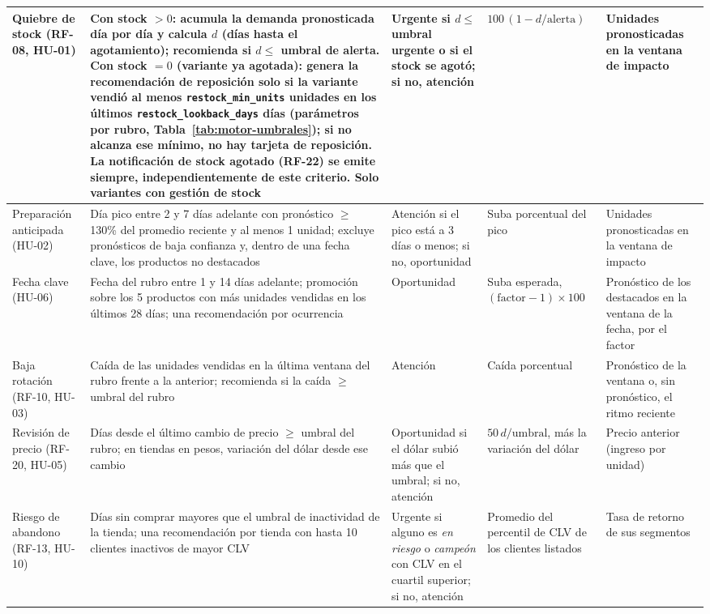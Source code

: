 {\begin{longtable}{|>{\raggedright\arraybackslash}m{2.2cm}|>{\raggedright\arraybackslash}m{4.1cm}|>{\raggedright\arraybackslash}m{2.6cm}|>{\raggedright\arraybackslash}m{1.9cm}|>{\raggedright\arraybackslash}m{2.4cm}|}
Quiebre de stock (RF-08, HU-01) & Con stock $>0$: acumula la demanda pronosticada día por día y calcula $d$ (días hasta el agotamiento); recomienda si $d \le$ umbral de alerta. Con stock $= 0$ (variante ya agotada): genera la recomendación de reposición solo si la variante vendió al menos \texttt{restock\_min\_units} unidades en los últimos \texttt{restock\_lookback\_days} días (parámetros por rubro, Tabla~\ref{tab:motor-umbrales}); si no alcanza ese mínimo, no hay tarjeta de reposición. La notificación de stock agotado (RF-22) se emite siempre, independientemente de este criterio. Solo variantes con gestión de stock & Urgente si $d \le$ umbral urgente o si el stock se agotó; si no, atención & $100\,(1 - d/\text{alerta})$ & Unidades pronosticadas en la ventana de impacto \\
\hline
Preparación anticipada (HU-02) & Día pico entre 2 y 7 días adelante con pronóstico $\ge$ 130\% del promedio reciente y al menos 1 unidad; excluye pronósticos de baja confianza y, dentro de una fecha clave, los productos no destacados & Atención si el pico está a 3 días o menos; si no, oportunidad & Suba porcentual del pico & Unidades pronosticadas en la ventana de impacto \\
\hline
Fecha clave (HU-06) & Fecha del rubro entre 1 y 14 días adelante; promoción sobre los 5 productos con más unidades vendidas en los últimos 28 días; una recomendación por ocurrencia & Oportunidad & Suba esperada, $(\text{factor} - 1) \times 100$ & Pronóstico de los destacados en la ventana de la fecha, por el factor \\
\hline
Baja rotación (RF-10, HU-03) & Caída de las unidades vendidas en la última ventana del rubro frente a la anterior; recomienda si la caída $\ge$ umbral del rubro & Atención & Caída porcentual & Pronóstico de la ventana o, sin pronóstico, el ritmo reciente \\
\hline
Revisión de precio (RF-20, HU-05) & Días desde el último cambio de precio $\ge$ umbral del rubro; en tiendas en pesos, variación del dólar desde ese cambio & Oportunidad si el dólar subió más que el umbral; si no, atención & $50\,d/\text{umbral}$, más la variación del dólar & Precio anterior (ingreso por unidad) \\
\hline
Riesgo de abandono (RF-13, HU-10) & Días sin comprar mayores que el umbral de inactividad de la tienda; una recomendación por tienda con hasta 10 clientes inactivos de mayor CLV & Urgente si alguno es \emph{en riesgo} o \emph{campeón} con CLV en el cuartil superior; si no, atención & Promedio del percentil de CLV de los clientes listados & Tasa de retorno de sus segmentos \\

\end{longtable}}
